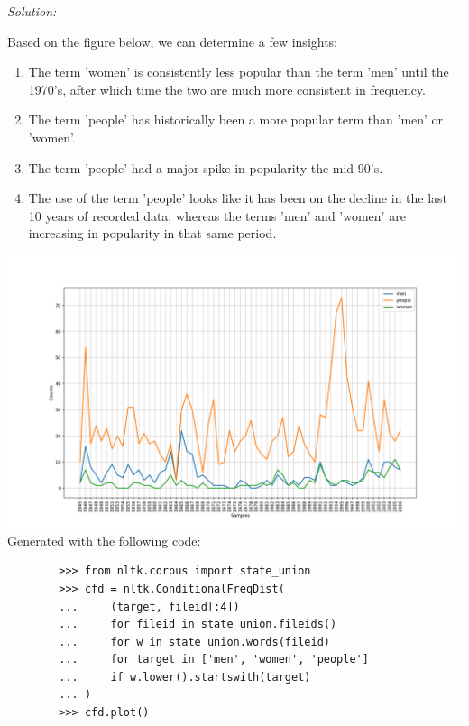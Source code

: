 \documentclass[11pt]{article}
\newenvironment{solution}{
	\vspace{10px}\noindent\emph{Solution:}
}{
	\vspace{10px}
}
\begin{document}
\begin{solution}
	
	Based on the figure below, we can determine a few insights: 
	\begin{enumerate}
		
		\item The term 'women' is consistently less popular than the term 'men' until the 1970's, after which time the two are much more consistent in frequency.
		
		\item The term 'people' has historically been a more popular term than 'men' or 'women'.
		
		\item The term 'people' had a major spike in popularity the mid 90's.
		
		\item The use of the term 'people' looks like it has been on the decline in the last 10 years of recorded data, whereas the terms 'men' and 'women' are increasing in popularity in that same period.
	\end{enumerate}
	\hspace*{-50pt}
	\includegraphics[width=550pt]{state_of_the_union_comp_men_people_women.png}
	Generated with the following code:
	\begin{lstlisting}
		>>> from nltk.corpus import state_union
		>>> cfd = nltk.ConditionalFreqDist(
		...     (target, fileid[:4])
		...     for fileid in state_union.fileids()
		...     for w in state_union.words(fileid)
		...     for target in ['men', 'women', 'people']
		...     if w.lower().startswith(target)
		... )
		>>> cfd.plot()
	\end{lstlisting}
	
\end{solution}  
\end{document}

